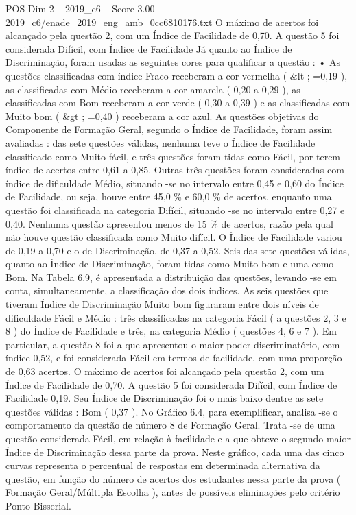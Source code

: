 \begin{textsample}{POS Dim 2 – 2019\_c6 – Score 3.00 – 2019\_c6/enade\_2019\_eng\_amb\_0cc6810176.txt}
O máximo de acertos foi alcançado pela questão 2, com um Índice de Facilidade de 0,70.
A questão 5 foi considerada Difícil, com Índice de Facilidade Já quanto ao Índice de Discriminação, foram usadas as seguintes cores para qualificar a questão : • As questões classificadas com índice Fraco receberam a cor vermelha ( \&lt ; =0,19 ), as classificadas com Médio receberam a cor amarela ( 0,20 a 0,29 ), as classificadas com Bom receberam a cor verde ( 0,30 a 0,39 ) e as classificadas com Muito bom ( \&gt ; =0,40 ) receberam a cor azul.
As questões objetivas do Componente de Formação Geral, segundo o Índice de Facilidade, foram assim avaliadas : das sete questões válidas, nenhuma teve o Índice de Facilidade classificado como Muito fácil, e três questões foram tidas como Fácil, por terem índice de acertos entre 0,61 a 0,85.
Outras três questões foram consideradas com índice de dificuldade Médio, situando -se no intervalo entre 0,45 e 0,60 do Índice de Facilidade, ou seja, houve entre 45,0 \% e 60,0 \% de acertos, enquanto uma questão foi classificada na categoria Difícil, situando -se no intervalo entre 0,27 e 0,40.
Nenhuma questão apresentou menos de 15 \% de acertos, razão pela qual não houve questão classificada como Muito difícil.
O Índice de Facilidade variou de 0,19 a 0,70 e o de Discriminação, de 0,37 a 0,52.
Seis das sete questões válidas, quanto ao Índice de Discriminação, foram tidas como Muito bom e uma como Bom.
Na Tabela 6.9, é apresentada a distribuição das questões, levando -se em conta, simultaneamente, a classificação dos dois índices.
As seis questões que tiveram Índice de Discriminação Muito bom figuraram entre dois níveis de dificuldade Fácil e Médio : três classificadas na categoria Fácil ( a questões 2, 3 e 8 ) do Índice de Facilidade e três, na categoria Médio ( questões 4, 6 e 7 ).
Em particular, a questão 8 foi a que apresentou o maior poder discriminatório, com índice 0,52, e foi considerada Fácil em termos de facilidade, com uma proporção de 0,63 acertos.
O máximo de acertos foi alcançado pela questão 2, com um Índice de Facilidade de 0,70.
A questão 5 foi considerada Difícil, com Índice de Facilidade 0,19.
Seu Índice de Discriminação foi o mais baixo dentre as sete questões válidas : Bom ( 0,37 ).
No Gráfico 6.4, para exemplificar, analisa -se o comportamento da questão de número 8 de Formação Geral.
Trata -se de uma questão considerada Fácil, em relação à facilidade e a que obteve o segundo maior Índice de Discriminação dessa parte da prova.
Neste gráfico, cada uma das cinco curvas representa o percentual de respostas em determinada alternativa da questão, em função do número de acertos dos estudantes nessa parte da prova ( Formação Geral/Múltipla Escolha ), antes de possíveis eliminações pelo critério Ponto-Bisserial.

\end{textsample}
